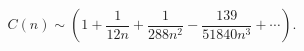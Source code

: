 \begin{equation*}[sizing=native]
 C(n)\sim\left(1+\frac{1}{12n}
 +\frac{1}{288n^2}
 -\frac{139}{51840n^3}
 +\cdots\right).
\end{equation*}
